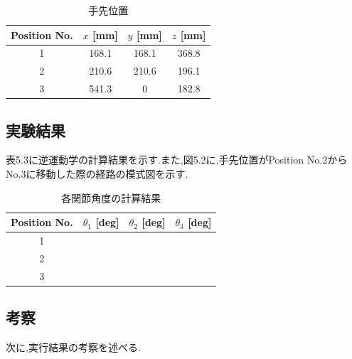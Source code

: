 \begin{table}[h]
  \centering
  \caption{手先位置}
  \begin{tabular}{|c|c|c|c|}
    \hline
    Position No. & $x$ [mm] & $y$ [mm] & $z$ [mm] \\ \hline
    \hline
    1            & 168.1    & 168.1    & 368.8    \\ \hline
    2            & 210.6    & 210.6    & 196.1    \\ \hline
    3            & 541.3    & 0        & 182.8    \\ \hline
  \end{tabular}
\end{table}


\subsection{実験結果}
表5.3に逆運動学の計算結果を示す.また,図5.2に,手先位置がPosition No.2からNo.3に移動した際の経路の模式図を示す.

\begin{table}[h]
  \centering
  \caption{各関節角度の計算結果}
  \begin{tabular}{|c|c|c|c|}
    \hline
    Position No. & $\theta_1$ [deg] & $\theta_2$ [deg] & $\theta_3$ [deg] \\ \hline
    \hline
    1            &                  &                  &                  \\ \hline
    2            &                  &                  &                  \\ \hline
    3            &                  &                  &                  \\ \hline
  \end{tabular}
\end{table}

\subsection{考察}
次に,実行結果の考察を述べる.
